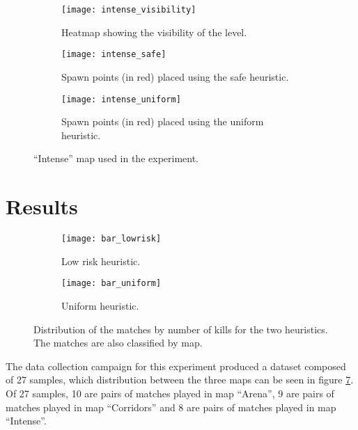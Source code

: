 \begin{figure}[tp]
	\centering  	
  	\begin{subfigure}[t]{0.3\linewidth}
    		\texttt{[image: intense\_visibility]}
     		\caption{Heatmap showing the visibility of the level.}
		\label{img:intense_visibility}
  	\end{subfigure}  	
  	\hfil
  	\begin{subfigure}[t]{0.3\linewidth}
    		\texttt{[image: intense\_safe]}
     		\caption{Spawn points (in red) placed using the safe heuristic.}
     		\label{img:intense_safe}
  	\end{subfigure}
  	\hfil
  	\begin{subfigure}[t]{0.3\linewidth}
    		\texttt{[image: intense\_uniform]}
     		\caption{Spawn points (in red) placed using the uniform heuristic.}
		\label{img:intense_uniform}
  	\end{subfigure}
	\caption{``Intense'' map used in the experiment.}
	\label{img:intense}	
\end{figure}


\section{Results}

\begin{figure}
 	\centering
  	\begin{subfigure}[t]{0.8\linewidth}
    		\texttt{[image: bar\_lowrisk]}
     		\caption{Low risk heuristic.}
		\label{img:bar_lowrisk}
  	\end{subfigure}  	
  	\begin{subfigure}[t]{0.8\linewidth}
    		\texttt{[image: bar\_uniform]}
     		\caption{Uniform heuristic.}
     		\label{img:bar_uniform}
  	\end{subfigure}
	\caption[Distribution of the matches by number of kills for the two heuristics.]{Distribution of the matches by number of kills for the two heuristics. The matches are also classified by map.}
	\label{img:match_distribution}	
\end{figure}

The data collection campaign for this experiment produced a dataset composed of 27 samples, which distribution between the three maps can be seen in figure \ref{img:match_distribution}. Of 27 samples, 10 are pairs of matches played in map ``Arena'', 9 are pairs of matches played in map ``Corridors'' and 8 are pairs of matches played in map ``Intense''. 

